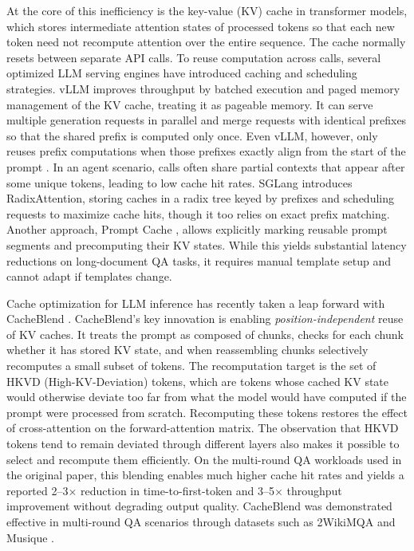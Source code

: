 At the core of this inefficiency is the key-value (KV) cache in transformer models, which stores intermediate attention states of processed tokens so that each new token need not recompute attention over the entire sequence. The cache normally resets between separate API calls. To reuse computation across calls, several optimized LLM serving engines have introduced caching and scheduling strategies. vLLM \cite{kwon2023vllm} improves throughput by batched execution and paged memory management of the KV cache, treating it as pageable memory. It can serve multiple generation requests in parallel and merge requests with identical prefixes so that the shared prefix is computed only once. Even vLLM, however, only reuses prefix computations when those prefixes exactly align from the start of the prompt \cite{kwon2023vllm, zheng2024sglangefficientexecutionstructured}. In an agent scenario, calls often share partial contexts that appear after some unique tokens, leading to low cache hit rates. SGLang \cite{zheng2024sglangefficientexecutionstructured} introduces RadixAttention, storing caches in a radix tree keyed by prefixes and scheduling requests to maximize cache hits, though it too relies on exact prefix matching. Another approach, Prompt Cache \cite{gim2024promptcachemodularattention}, allows explicitly marking reusable prompt segments and precomputing their KV states. While this yields substantial latency reductions on long-document QA tasks, it requires manual template setup and cannot adapt if templates change.

Cache optimization for LLM inference has recently taken a leap forward with CacheBlend \cite{yao2025cacheblendfastlargelanguage}. CacheBlend's key innovation is enabling \emph{position-independent} reuse of KV caches. It treats the prompt as composed of chunks, checks for each chunk whether it has stored KV state, and when reassembling chunks selectively recomputes a small subset of tokens. The recomputation target is the set of HKVD (High-KV-Deviation) tokens, which are tokens whose cached KV state would otherwise deviate too far from what the model would have computed if the prompt were processed from scratch. Recomputing these tokens restores the effect of cross-attention on the forward-attention matrix. The observation that HKVD tokens tend to remain deviated through different layers also makes it possible to select and recompute them efficiently. On the multi-round QA workloads used in the original paper, this blending enables much higher cache hit rates and yields a reported 2--3$\times$ reduction in time-to-first-token and 3--5$\times$ throughput improvement without degrading output quality. CacheBlend was demonstrated effective in multi-round QA scenarios through datasets such as 2WikiMQA and Musique \cite{ho2020constructingmultihopqadataset, trivedi2022musiquemultihopquestionssinglehop}.

